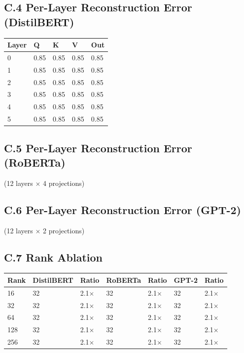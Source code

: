 \subsection{C.4 Per-Layer Reconstruction Error (DistilBERT)}

\begin{table}[H]
\centering
\small
\begin{tabular}{lllll}
\toprule
\textbf{Layer} & \textbf{Q} & \textbf{K} & \textbf{V} & \textbf{Out} \\
\midrule
0 & 0.85 & 0.85 & 0.85 & 0.85 \\
1 & 0.85 & 0.85 & 0.85 & 0.85 \\
2 & 0.85 & 0.85 & 0.85 & 0.85 \\
3 & 0.85 & 0.85 & 0.85 & 0.85 \\
4 & 0.85 & 0.85 & 0.85 & 0.85 \\
5 & 0.85 & 0.85 & 0.85 & 0.85 \\
\bottomrule
\end{tabular}
\end{table}

\subsection{C.5 Per-Layer Reconstruction Error (RoBERTa)}

(12 layers $\times$ 4 projections)

\subsection{C.6 Per-Layer Reconstruction Error (GPT-2)}

(12 layers $\times$ 2 projections)

\subsection{C.7 Rank Ablation}

\begin{table}[H]
\centering
\small
\begin{tabular}{lllllll}
\toprule
\textbf{Rank} & \textbf{DistilBERT} & \textbf{Ratio} & \textbf{RoBERTa} & \textbf{Ratio} & \textbf{GPT-2} & \textbf{Ratio} \\
\midrule
16 & 32 & 2.1$\times$ & 32 & 2.1$\times$ & 32 & 2.1$\times$ \\
32 & 32 & 2.1$\times$ & 32 & 2.1$\times$ & 32 & 2.1$\times$ \\
64 & 32 & 2.1$\times$ & 32 & 2.1$\times$ & 32 & 2.1$\times$ \\
128 & 32 & 2.1$\times$ & 32 & 2.1$\times$ & 32 & 2.1$\times$ \\
256 & 32 & 2.1$\times$ & 32 & 2.1$\times$ & 32 & 2.1$\times$ \\
\bottomrule
\end{tabular}
\end{table}

